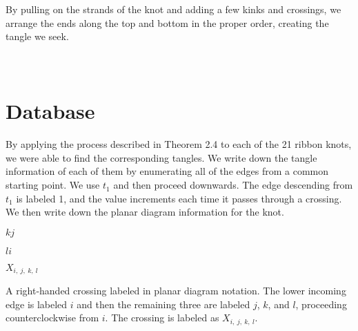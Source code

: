 \documentclass{ws-jktr}
\begin{document}
\\\\

By pulling on the strands of the knot and adding a few kinks and crossings, we
arrange the ends along the top and bottom in the proper order, creating the
tangle we seek.\\

\\\\

\section{Database}

By applying the process described in Theorem 2.4 to each of the 21 ribbon knots,
we were able to find the corresponding tangles.
We write down the tangle information of each of them by enumerating all of the
edges from a common starting point.
We use $t_1$ and then proceed downwards.
The edge descending from $t_1$ is labeled 1, and the value increments each time
it passes through a crossing.
We then write down the planar diagram information for the knot.\\

{\hspace{0.3in}\hspace{0.275\columnwidth}$k$\hspace{0.2\columnwidth}$j$
\vspace{-0.5em}\begin{center}\end{center}
\vspace{-0.5em}
\hspace{0.3in}\hspace{0.275\columnwidth}$l$\hspace{0.2\columnwidth}$i$

\hspace{0.3in}\hspace{0.31\columnwidth}$X_{i,~j,~k,~l}$}
{A right-handed crossing labeled in planar diagram notation.
The lower incoming edge is labeled $i$ and then the remaining three are
labeled $j$, $k$, and $l$, proceeding counterclockwise from $i$.
The crossing is labeled as $X_{i,~j,~k,~l}$.}\\\\
\end{document}
